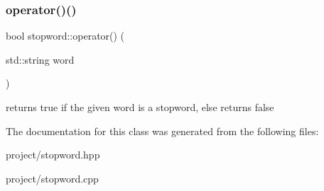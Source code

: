 \subsubsection{\texorpdfstring{operator()()}{operator()()}}
{\footnotesize\ttfamily bool stopword\+::operator() (\begin{DoxyParamCaption}\item[{std\+::string}]{word }\end{DoxyParamCaption})}

returns true if the given word is a stopword, else returns false 

The documentation for this class was generated from the following files\+:\begin{DoxyCompactItemize}
\item 
project/stopword.\+hpp\item 
project/stopword.\+cpp\end{DoxyCompactItemize}
